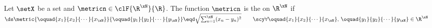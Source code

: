\begin{definition}
\label{def:emetric}
Let $\setX$ be a set and $\metricn\in\clF{\R^\xN}{\R}$.
The function $\metricn$ is the  on $\R^\xN$ if
\\\indentx$\ds
  \metric{\oquad{x_1}{x_2}{\cdots}{x_\xN}}{\oquad{y_1}{y_2}{\cdots}{y_\xN}}
    \eqd \sqrt{\sum_{n=1}^\xN (x_n-y_n)^2}
  \qquad\scy
  \forall\oquad{x_1}{x_2}{\cdots}{x_\xN},\,\oquad{y_1}{y_2}{\cdots}{y_\xN}\in\R^\xN
  $
\end{definition}

























